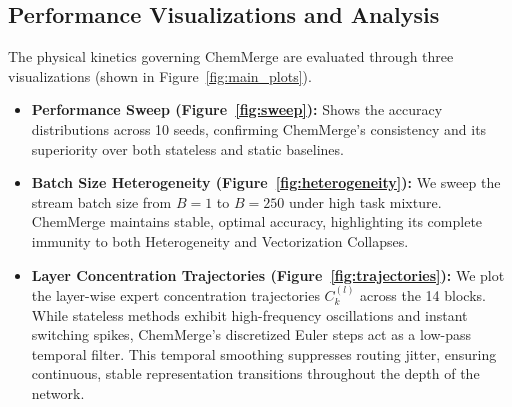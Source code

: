 \subsection{Performance Visualizations and Analysis}
The physical kinetics governing ChemMerge are evaluated through three visualizations (shown in Figure~\ref{fig:main_plots}).
\begin{itemize}
    \item \textbf{Performance Sweep (Figure~\ref{fig:sweep}):} Shows the accuracy distributions across 10 seeds, confirming ChemMerge's consistency and its superiority over both stateless and static baselines.
    \item \textbf{Batch Size Heterogeneity (Figure~\ref{fig:heterogeneity}):} We sweep the stream batch size from $B=1$ to $B=250$ under high task mixture. ChemMerge maintains stable, optimal accuracy, highlighting its complete immunity to both Heterogeneity and Vectorization Collapses.
    \item \textbf{Layer Concentration Trajectories (Figure~\ref{fig:trajectories}):} We plot the layer-wise expert concentration trajectories $C_k^{(l)}$ across the 14 blocks. While stateless methods exhibit high-frequency oscillations and instant switching spikes, ChemMerge's discretized Euler steps act as a low-pass temporal filter. This temporal smoothing suppresses routing jitter, ensuring continuous, stable representation transitions throughout the depth of the network.
\end{itemize}

